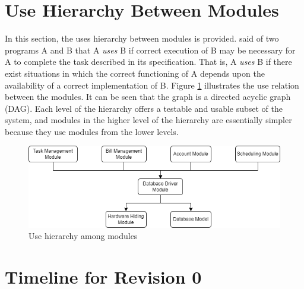 \documentclass[12pt, titlepage]{article}
\begin{document}
\section{Use Hierarchy Between Modules} \label{SecUse}

In this section, the uses hierarchy between modules is
provided. \citet{Parnas1978} said of two programs A and B that A {\em uses} B if correct execution of B may be necessary for A to complete the task described in its specification. That is, A {\em uses} B if there exist situations in which the correct functioning of A depends upon the availability of a correct implementation of B.  Figure \ref{FigUH} illustrates the use relation between the modules. It can be seen that the graph is a directed acyclic graph (DAG). Each level of the hierarchy offers a testable and usable subset of the system, and modules in the higher level of the hierarchy are essentially simpler
because they use modules from the lower levels.

\begin{figure}[H]
\centering
\includegraphics[width=\textwidth]{UsesHierarchy.png}
\caption{Use hierarchy among modules}
\label{FigUH}
\end{figure}


\section{Timeline for Revision 0} \label{Timeline}
\end{document}
